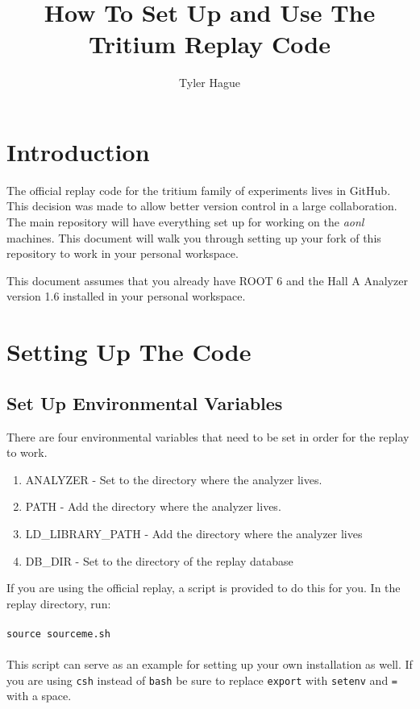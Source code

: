 \documentclass{report}
\begin{document}
\title{How To Set Up and Use The Tritium Replay Code}
\author{Tyler Hague}
\maketitle

\chapter{Introduction}
The official replay code for the tritium family of experiments lives in GitHub. This decision was made to allow better version control in a large collaboration. The main repository will have everything set up for working on the \textit{aonl} machines. This document will walk you through setting up your fork of this repository to work in your personal workspace.

This document assumes that you already have ROOT 6 and the Hall A Analyzer version 1.6 installed in your personal workspace.

\chapter{Setting Up The Code}

\section{Set Up Environmental Variables}

There are four environmental variables that need to be set in order for the replay to work.

\begin{enumerate}
\item ANALYZER - Set to the directory where the analyzer lives.
\item PATH - Add the directory where the analyzer lives.
\item LD\_LIBRARY\_PATH - Add the directory where the analyzer lives
\item DB\_DIR - Set to the directory of the replay database
\end{enumerate}

If you are using the official replay, a script is provided to do this for you. In the replay directory, run:
\\\\
\texttt{source sourceme.sh}
\\\\
This script can serve as an example for setting up your own installation as well. If you are using \texttt{csh} instead of \texttt{bash} be sure to replace \texttt{export} with \texttt{setenv} and \texttt{=} with a space.
\end{document}
